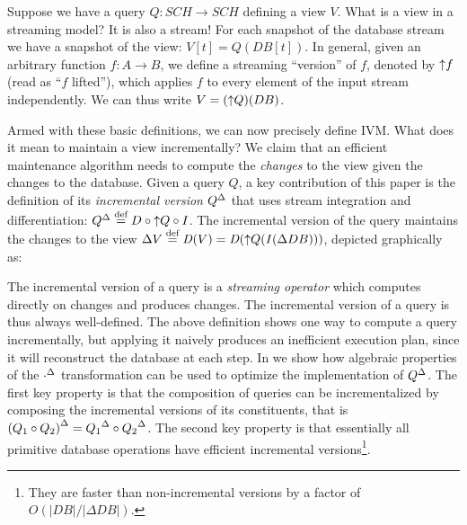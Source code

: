 Suppose we have a query $Q : SCH \to SCH$ defining a view $V$.  What is
a view in a streaming model?  It is also a stream!  For each snapshot
of the database stream we have a snapshot of the view: $V[t] = Q(DB[t])$.
In general, given an arbitrary function $f: A \to B$, we define
a streaming ``version'' of $f$, denoted by ${\uparrow}f$
(read as ``$f$ lifted''), which applies
$f$ to every element of the input stream independently.
We can thus write $V = ({\uparrow}Q)(DB)$.

Armed with these basic definitions, we can now precisely define IVM.
What does it mean to maintain a view incrementally?  We claim that an
efficient maintenance algorithm needs to compute the \emph{changes} to
the view given the changes to the database. Given a query $Q$, a key
contribution of this paper is the definition of its \emph{incremental
  version} ${Q}^{\Delta}$ that uses stream integration and differentiation:
${Q}^{\Delta} \stackrel{\textrm{\scriptsize def}}{=} D \circ {\uparrow}Q \circ I$. The incremental version of
the query maintains the changes to the view $\Delta V \stackrel{\textrm{\scriptsize def}}{=} \mathit{D}(V) =
\mathit{D}({\uparrow}Q(\mathit{I}(\Delta DB)))$, depicted graphically as:

\begin{center}
\end{center}

The incremental version of a query is a \emph{streaming operator}
which computes directly on changes and produces changes.  The
incremental version of a query is thus always well-defined.  The above
definition shows one way to compute a query incrementally, but
applying it naively produces an inefficient execution plan, since it
will reconstruct the database at each step.  In
 we show how algebraic properties of the
${\cdot}^{\Delta}$ transformation can be used to optimize the
implementation of ${Q}^{\Delta}$. The first key property is that the
composition of queries can be incrementalized by composing the
incremental versions of its constituents, that is ${(Q_1 \circ
  Q_2)}^{\Delta} = {Q_1}^{\Delta} \circ {Q_2}^{\Delta}$.  The second key property is that
essentially all primitive database operations have efficient
incremental versions\footnote{They are faster than non-incremental
versions by a factor of $O(|DB|/|\Delta DB|)$.}.

